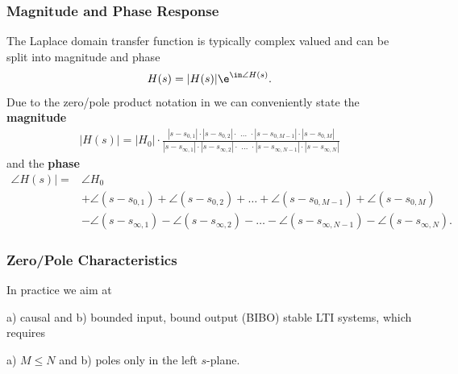 \subsubsection{Magnitude and Phase Response}
The Laplace domain transfer function is typically complex valued and can be
split into magnitude and phase
\begin{align}
H(s) = |H(s)| \e^{\im \angle H(s)}.
\end{align}
%
Due to the zero/pole product notation in 
we can conveniently state the \textbf{magnitude}
\begin{align}
\label{eq:Hs_H0_z_p_mag}
|H(s)| = |H_0| \cdot \frac
{|s-s_{0,1}| \cdot |s-s_{0,2}| \cdot  \,\,\dots \,\,\cdot  |s-s_{0,M-1}| \cdot  |s-s_{0,M}|}
{|s-s_{\infty,1}| \cdot  |s-s_{\infty,2}| \cdot  \,\,\dots\,\, \cdot |s-s_{\infty,N-1}| \cdot |s-s_{\infty,N}|}
\end{align}
and the \textbf{phase}
\begin{align}
\label{eq:Hs_H0_z_p_phase}
\angle H(s)| =& \angle H_0\nonumber\\
&
+\angle (s-s_{0,1})
+\angle (s-s_{0,2})
+\dots
+\angle (s-s_{0,M-1})
+\angle (s-s_{0,M})\nonumber\\
&
-\angle (s-s_{\infty,1})
-\angle (s-s_{\infty,2})
-\dots
-\angle (s-s_{\infty,N-1})
-\angle (s-s_{\infty,N}).
\end{align}


\subsubsection{Zero/Pole Characteristics}
In practice we aim at

a) causal and b) bounded input, bound output (BIBO) stable LTI systems, which requires

a) $M\leq N$ and b) poles only in the left $s$-plane.
%

